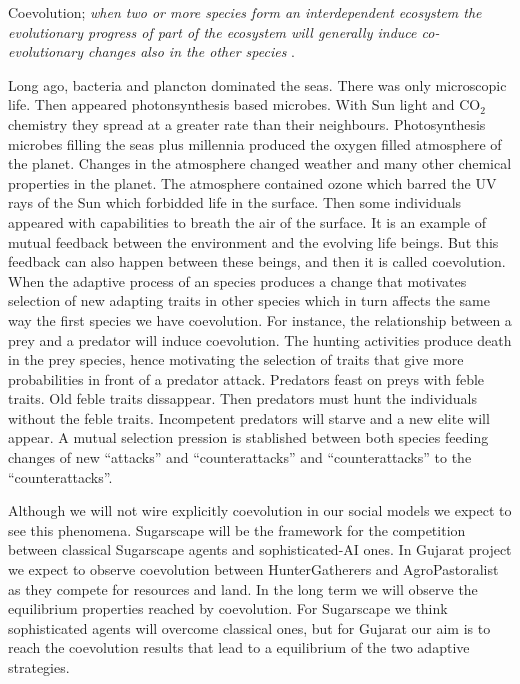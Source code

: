 \documentclass[11pt,oneside,a4paper,openright]{report}
\begin{document}
Coevolution; \textit{when two or more species form an interdependent ecosystem the evolutionary progress of part of the ecosystem will generally induce co-evolutionary changes also in the other species} \cite{Gross2008}.

Long ago, bacteria and plancton dominated the seas. There was only microscopic life. Then appeared photonsynthesis
based microbes. With Sun light and CO$_2$ chemistry they spread at a greater rate than their neighbours. Photosynthesis
microbes filling the seas plus millennia produced the oxygen filled atmosphere of the planet. Changes in the atmosphere
changed weather and many other chemical properties in the planet. The atmosphere contained ozone which barred the 
UV rays of the Sun which forbidded life in the surface. Then some individuals appeared with capabilities to
breath the air of the surface. It is an example of mutual feedback between the environment and the evolving life beings. 
But this feedback can also happen between these beings, and then it is called coevolution\cite{Dawkins1990}.
When the adaptive process of an species produces a change that motivates selection of new adapting traits in other
species which in turn affects the same way the first species we have coevolution. For instance, the relationship 
between a prey and a predator will induce coevolution. The hunting activities produce death in the prey species, hence
motivating the selection of traits that give more probabilities in front of a predator attack. Predators feast on preys 
with feble traits. Old feble traits dissappear. Then predators must hunt the individuals without the feble traits. Incompetent 
predators will starve and a new elite will appear. A mutual selection pression is stablished between both species feeding 
changes of new ``attacks'' and ``counterattacks'' and ``counterattacks'' to the ``counterattacks''.

Although we will not wire explicitly coevolution in our social models we expect to see this phenomena. Sugarscape will
be the framework for the competition between classical Sugarscape agents and sophisticated-AI ones. In Gujarat project
we expect to observe coevolution between HunterGatherers and AgroPastoralist as they compete for resources and land.
In the long term we will observe the equilibrium properties reached by coevolution. For Sugarscape we think sophisticated 
agents will overcome classical ones, but for Gujarat our aim is to reach the coevolution results that lead to a equilibrium 
of the two adaptive strategies. 
\end{document}
